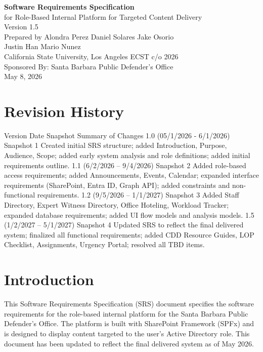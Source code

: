 \documentclass[12pt]{article}
\begin{document}
\begin{titlepage}
\centering
\vspace*{1in}
{\LARGE\bfseries Software Requirements Specification\\[0.25in]}
{\large for Role-Based Internal Platform for Targeted Content Delivery\\[0.4in]}
Version 1.5\\
Prepared by Alondra Perez
Daniel Solares
Jake Osorio\\
Justin Han
Mario Nunez\\
California State University, Los Angeles ECST c/o 2026\\
Sponsored By: Santa Barbara Public Defender's Office\\
May 8, 2026\\
\vfill
\end{titlepage}

\tableofcontents
\clearpage
\section*{Revision History}

Version Date Snapshot Summary of Changes 1.0 (05/1/2026 - 6/1/2026) Snapshot 1 Created initial SRS structure; added Introduction, Purpose, Audience, Scope; added early system analysis and role definitions; added initial requirements outline. 1.1 (6/2/2026 -- 9/4/2026) Snapshot 2 Added role-based access requirements; added Announcements, Events, Calendar; expanded interface requirements (SharePoint, Entra ID, Graph API); added constraints and non-functional requirements. 1.2 (9/5/2026 -- 1/1/2027) Snapshot 3 Added Staff Directory, Expert Witness Directory, Office Hoteling, Workload Tracker; expanded database requirements; added UI flow models and analysis models. 1.5 (1/2/2027 -- 5/1/2027) Snapshot 4 Updated SRS to reflect the final delivered system; finalized all functional requirements; added CDD Resource Guides, LOP Checklist, Assignments, Urgency Portal; resolved all TBD items.

\section{Introduction}

This Software Requirements Specification (SRS) document specifies the software requirements for the role-based internal platform for the Santa Barbara Public Defender's Office. The platform is built with SharePoint Framework (SPFx) and is designed to display content targeted to the user's Active Directory role. This document has been updated to reflect the final delivered system as of May 2026.
\end{document}
